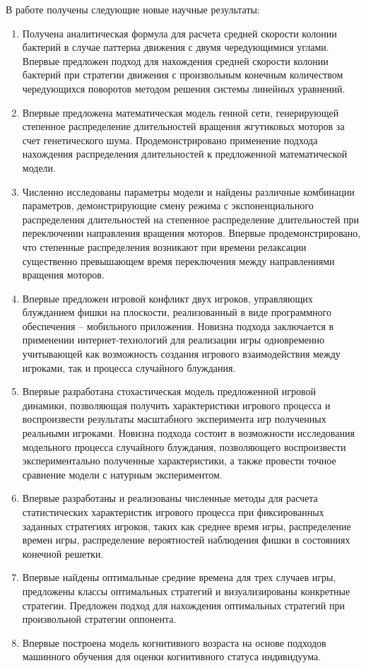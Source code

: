 {\novelty}
В работе получены следующие новые научные результаты:
\begin{enumerate}[beginpenalty=10000] %
  \item Получена аналитическая формула для расчета средней скорости колонии бактерий в случае паттерна движения с двумя чередующимися углами. Впервые предложен подход для нахождения средней скорости колонии бактерий при стратегии движения с произвольным конечным количеством чередующихся поворотов методом решения системы линейных уравнений.
  \item Впервые предложена математическая модель генной сети, генерирующей степенное распределение длительностей вращения жгутиковых моторов за счет генетического шума. Продемонстрировано применение подхода нахождения распределения длительностей к предложенной математической модели.
  \item Численно исследованы параметры модели и найдены различные комбинации параметров, демонстрирующие смену режима с экспоненциального распределения длительностей на степенное распределение длительностей при переключении направления вращения моторов. Впервые продемонстрировано, что степенные распределения возникают при времени релаксации существенно превышающем время переключения между направлениями вращения моторов.
  \item Впервые предложен игровой конфликт двух игроков, управляющих блужданием фишки на плоскости, реализованный в виде программного обеспечения -- мобильного приложения. Новизна подхода заключается в применении интернет-технологий для реализации игры одновременно учитывающей как возможность создания игрового взаимодействия между игроками, так и процесса случайного блуждания.
  \item Впервые разработана стохастическая модель предложенной игровой динамики, позволяющая получить характеристики игрового процесса и воспроизвести результаты масштабного эксперимента игр полученных реальными игроками. Новизна подхода состоит в возможности исследования модельного процесса случайного блуждания, позволяющего воспроизвести экспериментально полученные характеристики, а также провести точное сравнение модели с натурным экспериментом.
  \item Впервые разработаны и реализованы численные методы для расчета статистических характеристик игрового процесса при фиксированных заданных стратегиях игроков, таких как среднее время игры, распределение времен игры, распределение вероятностей наблюдения фишки в состояниях конечной решетки. 
  \item Впервые найдены оптимальные средние времена для трех случаев игры, предложены классы оптимальных стратегий и визуализированы конкретные стратегии. Предложен подход для нахождения оптимальных стратегий при произвольной стратегии оппонента.
  \item Впервые построена модель когнитивного возраста на основе подходов машинного обучения для оценки когнитивного статуса индивидуума.
\end{enumerate}

